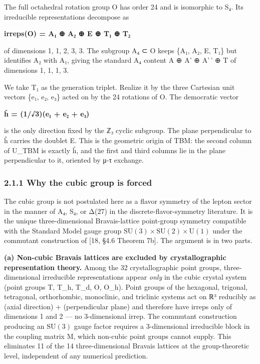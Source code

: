 \documentclass[
  11pt,
  letterpaper,
]{article}
\begin{document}
The full octahedral rotation group O has order 24 and is isomorphic to
S₄. Its irreducible representations decompose as

\textbf{irreps(O) = A₁ ⊕ A₂ ⊕ E ⊕ T₁ ⊕ T₂}

of dimensions 1, 1, 2, 3, 3. The subgroup A₄ ⊂ O keeps \{A₁, A₂, E, T₁\}
but identifies A₂ with A₁, giving the standard A₄ content A ⊕ A' ⊕ A'\,'
⊕ T of dimensions 1, 1, 1, 3.

We take T₁ as the generation triplet. Realize it by the three Cartesian
unit vectors \{e₁, e₂, e₃\} acted on by the 24 rotations of O. The
democratic vector

\textbf{ĥ = (1/√3)(e₁ + e₂ + e₃)}

is the only direction fixed by the ℤ₃ cyclic subgroup. The plane
perpendicular to ĥ carries the doublet E. This is the geometric origin
of TBM: the second column of U\_TBM is exactly ĥ, and the first and
third columns lie in the plane perpendicular to it, oriented by μ-τ
exchange.

\hypertarget{why-the-cubic-group-is-forced}{%
\subsubsection{2.1.1 Why the cubic group is
forced}\label{why-the-cubic-group-is-forced}}

The cubic group is not postulated here as a flavor symmetry of the
lepton sector in the manner of A₄, S₄, or Δ(27) in the
discrete-flavor-symmetry literature. It is the unique three-dimensional
Bravais-lattice point-group symmetry compatible with the Standard Model
gauge group
\(\mathrm{SU}(3) \times \mathrm{SU}(2) \times \mathrm{U}(1)\) under the
commutant construction of {[}18, §4.6 Theorem 7b{]}. The argument is in
two parts.

\textbf{(a) Non-cubic Bravais lattices are excluded by crystallographic
representation theory.} Among the 32 crystallographic point groups,
three-dimensional irreducible representations appear \emph{only} in the
cubic crystal system (point groups T, T\_h, T\_d, O, O\_h). Point groups
of the hexagonal, trigonal, tetragonal, orthorhombic, monoclinic, and
triclinic systems act on ℝ³ reducibly as (axial direction) +
(perpendicular plane) and therefore have irreps only of dimensions 1 and
2 --- no 3-dimensional irrep. The commutant construction producing an
\(\mathrm{SU}(3)\) gauge factor requires a 3-dimensional irreducible
block in the coupling matrix M, which non-cubic point groups cannot
supply. This eliminates 11 of the 14 three-dimensional Bravais lattices
at the group-theoretic level, independent of any numerical prediction.
\end{document}
